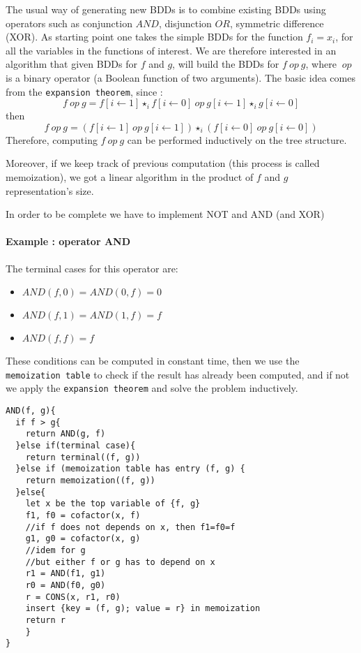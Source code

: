 \documentclass[a4paper,10pt]{article}
\begin{document}
\newcommand{\op}{~op~}

The usual way of generating new BDDs is to combine existing BDDs using operators such as conjunction $AND$, disjunction $OR$, symmetric difference (XOR).
As starting point one takes the simple BDDs for the function $f_i = x_i$, for all the variables in the functions of interest.
We are therefore interested in an algorithm that given BDDs for $f$ and $g$, will build the BDDs for $f\op g$, where $\op$ is a binary operator (a Boolean function of two arguments). The basic idea comes from the \texttt{expansion theorem}, since :
\[f\op g = f[i\leftarrow 1]\star_i f[i\leftarrow 0] \op g[i\leftarrow 1]\star_i g[i\leftarrow 0]\]
then
\[f\op g = (f[i\leftarrow 1]\op g[i\leftarrow 1])\star_i(f[i\leftarrow 0] \op g[i\leftarrow 0])\]
Therefore, computing $f\op g$ can be performed inductively on the tree structure.

Moreover, if we keep track of previous computation (this process is called memoization), we got a linear algorithm in the product of $f$ and $g$ representation's size.

In order to be complete we have to implement NOT and AND (and XOR)

\paragraph{Example : operator AND\\}
The terminal cases for this operator are:\begin{itemize}
\item $AND(f, 0) = AND(0, f) = 0$
\item $AND(f, 1) = AND(1, f) = f$
\item $AND(f, f) = f$
\end{itemize}

These conditions can be computed in constant time, then we use the \texttt{memoization table} to check if the result has already been computed, and if not we apply the \texttt{expansion theorem} and solve the problem inductively.

\begin{lstlisting}
AND(f, g){
  if f > g{
    return AND(g, f)
  }else if(terminal case){
    return terminal((f, g))
  }else if (memoization table has entry (f, g) {
    return memoization((f, g))
  }else{
    let x be the top variable of {f, g}
    f1, f0 = cofactor(x, f)
    //if f does not depends on x, then f1=f0=f
    g1, g0 = cofactor(x, g)
    //idem for g
    //but either f or g has to depend on x
    r1 = AND(f1, g1)
    r0 = AND(f0, g0)
    r = CONS(x, r1, r0)
    insert {key = (f, g); value = r} in memoization
    return r
    }
}
\end{lstlisting}
\end{document}
